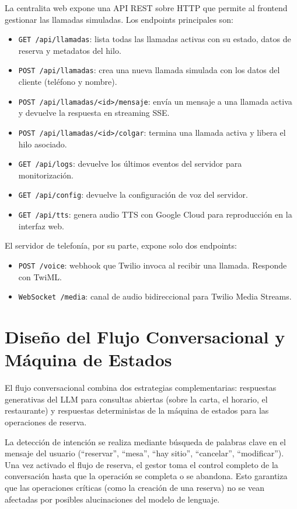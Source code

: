 La centralita web expone una API REST sobre HTTP que permite al frontend gestionar las llamadas simuladas. Los endpoints principales son:

\begin{itemize}
    \item \texttt{GET /api/llamadas}: lista todas las llamadas activas con su estado, datos de reserva y metadatos del hilo.
    \item \texttt{POST /api/llamadas}: crea una nueva llamada simulada con los datos del cliente (teléfono y nombre).
    \item \texttt{POST /api/llamadas/<id>/mensaje}: envía un mensaje a una llamada activa y devuelve la respuesta en streaming SSE.
    \item \texttt{POST /api/llamadas/<id>/colgar}: termina una llamada activa y libera el hilo asociado.
    \item \texttt{GET /api/logs}: devuelve los últimos eventos del servidor para monitorización.
    \item \texttt{GET /api/config}: devuelve la configuración de voz del servidor.
    \item \texttt{GET /api/tts}: genera audio TTS con Google Cloud para reproducción en la interfaz web.
\end{itemize}

El servidor de telefonía, por su parte, expone solo dos endpoints:

\begin{itemize}
    \item \texttt{POST /voice}: webhook que Twilio invoca al recibir una llamada. Responde con TwiML.
    \item \texttt{WebSocket /media}: canal de audio bidireccional para Twilio Media Streams.
\end{itemize}

\section{Diseño del Flujo Conversacional y Máquina de Estados}
\label{sec:flujo_conversacional}

El flujo conversacional combina dos estrategias complementarias: respuestas generativas del LLM para consultas abiertas (sobre la carta, el horario, el restaurante) y respuestas deterministas de la máquina de estados para las operaciones de reserva.


La detección de intención se realiza mediante búsqueda de palabras clave en el mensaje del usuario (``reservar'', ``mesa'', ``hay sitio'', ``cancelar'', ``modificar''). Una vez activado el flujo de reserva, el gestor toma el control completo de la conversación hasta que la operación se completa o se abandona. Esto garantiza que las operaciones críticas (como la creación de una reserva) no se vean afectadas por posibles alucinaciones del modelo de lenguaje.
